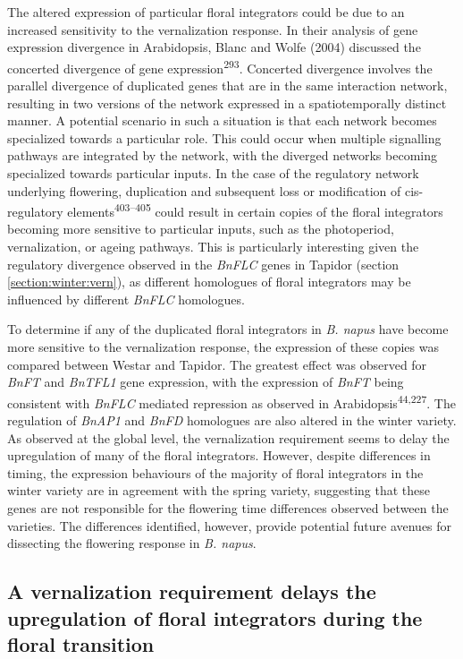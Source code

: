 \documentclass[12pt,]{book}
\begin{document}
The altered expression of particular floral integrators could be due to
an increased sensitivity to the vernalization response. In their
analysis of gene expression divergence in Arabidopsis, Blanc and Wolfe
(2004) discussed the concerted divergence of gene
expression\textsuperscript{293}. Concerted divergence involves the
parallel divergence of duplicated genes that are in the same interaction
network, resulting in two versions of the network expressed in a
spatiotemporally distinct manner. A potential scenario in such a
situation is that each network becomes specialized towards a particular
role. This could occur when multiple signalling pathways are integrated
by the network, with the diverged networks becoming specialized towards
particular inputs. In the case of the regulatory network underlying
flowering, duplication and subsequent loss or modification of
cis-regulatory elements\textsuperscript{403--405} could result in
certain copies of the floral integrators becoming more sensitive to
particular inputs, such as the photoperiod, vernalization, or ageing
pathways. This is particularly interesting given the regulatory
divergence observed in the \emph{BnFLC} genes in Tapidor (section
\ref{section:winter:vern}), as different homologues of floral
integrators may be influenced by different \emph{BnFLC} homologues.

To determine if any of the duplicated floral integrators in \emph{B.
napus} have become more sensitive to the vernalization response, the
expression of these copies was compared between Westar and Tapidor. The
greatest effect was observed for \emph{BnFT} and \emph{BnTFL1} gene
expression, with the expression of \emph{BnFT} being consistent with
\emph{BnFLC} mediated repression as observed in
Arabidopsis\textsuperscript{44,227}. The regulation of \emph{BnAP1} and
\emph{BnFD} homologues are also altered in the winter variety. As
observed at the global level, the vernalization requirement seems to
delay the upregulation of many of the floral integrators. However,
despite differences in timing, the expression behaviours of the majority
of floral integrators in the winter variety are in agreement with the
spring variety, suggesting that these genes are not responsible for the
flowering time differences observed between the varieties. The
differences identified, however, provide potential future avenues for
dissecting the flowering response in \emph{B. napus}.

\subsection{A vernalization requirement delays the upregulation of
floral integrators during the floral
transition}\label{section:winter:floraldelay}
\end{document}
